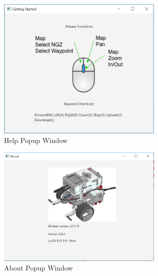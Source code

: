\begin{figure}[H]
	\centering
	\includegraphics[width=80mm]{Help.png}  
	\caption{Help Popup Window}
	\label{fig:other_help}           
\end{figure}

\begin{figure}[H]
	\centering
	\includegraphics[width=80mm]{About.png}  
	\caption{About Popup Window}
	\label{fig:other_about}
\end{figure}
